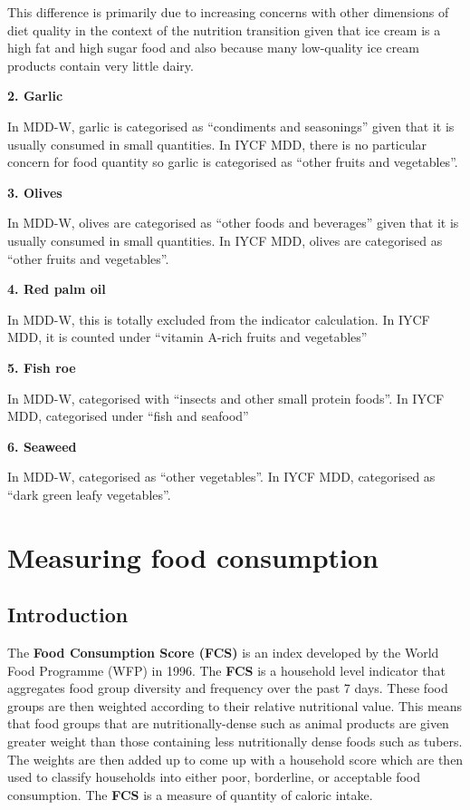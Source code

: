 \documentclass[12pt,]{book}
\theoremstyle{definition}
\theoremstyle{definition}
\theoremstyle{definition}
\theoremstyle{remark}
\begin{document}
This difference is primarily due to increasing concerns with other
dimensions of diet quality in the context of the nutrition transition
given that ice cream is a high fat and high sugar food and also because
many low-quality ice cream products contain very little dairy.

\textbf{2. Garlic}

In MDD-W, garlic is categorised as ``condiments and seasonings'' given
that it is usually consumed in small quantities. In IYCF MDD, there is
no particular concern for food quantity so garlic is categorised as
``other fruits and vegetables''.

\textbf{3. Olives}

In MDD-W, olives are categorised as ``other foods and beverages'' given
that it is usually consumed in small quantities. In IYCF MDD, olives are
categorised as ``other fruits and vegetables''.

\textbf{4. Red palm oil}

In MDD-W, this is totally excluded from the indicator calculation. In
IYCF MDD, it is counted under ``vitamin A-rich fruits and vegetables''

\textbf{5. Fish roe}

In MDD-W, categorised with ``insects and other small protein foods''. In
IYCF MDD, categorised under ``fish and seafood''

\textbf{6. Seaweed}

In MDD-W, categorised as ``other vegetables''. In IYCF MDD, categorised
as ``dark green leafy vegetables''.

\hypertarget{food}{%
\chapter{Measuring food consumption}\label{food}}

\hypertarget{introduction-2}{%
\section{Introduction}\label{introduction-2}}

The \textbf{Food Consumption Score (FCS)} is an index developed by the
World Food Programme (WFP) in 1996. The \textbf{FCS} is a household
level indicator that aggregates food group diversity and frequency over
the past 7 days. These food groups are then weighted according to their
relative nutritional value. This means that food groups that are
nutritionally-dense such as animal products are given greater weight
than those containing less nutritionally dense foods such as tubers. The
weights are then added up to come up with a household score which are
then used to classify households into either poor, borderline, or
acceptable food consumption. The \textbf{FCS} is a measure of quantity
of caloric intake.
\end{document}
